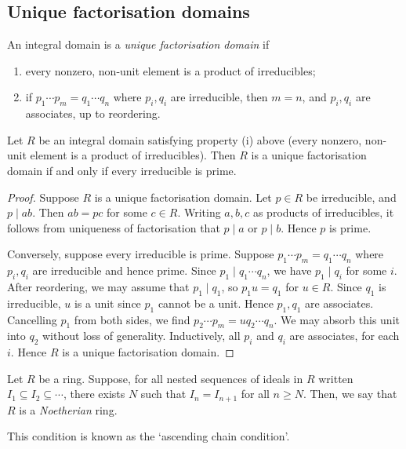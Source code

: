 \subsection{Unique factorisation domains}
\begin{definition}
	An integral domain is a \textit{unique factorisation domain} if
	\begin{enumerate}
		\item every nonzero, non-unit element is a product of irreducibles;
		\item if $p_1 \cdots p_m = q_1 \cdots q_n$ where $p_i, q_i$ are irreducible, then $m = n$, and $p_i, q_i$ are associates, up to reordering.
	\end{enumerate}
\end{definition}
\begin{proposition}
	Let $R$ be an integral domain satisfying property (i) above (every nonzero, non-unit element is a product of irreducibles).
	Then $R$ is a unique factorisation domain if and only if every irreducible is prime.
\end{proposition}
\begin{proof}
	Suppose $R$ is a unique factorisation domain.
	Let $p \in R$ be irreducible, and $p \mid ab$.
	Then $ab = pc$ for some $c \in R$.
	Writing $a, b, c$ as products of irreducibles, it follows from uniqueness of factorisation that $p \mid a$ or $p \mid b$.
	Hence $p$ is prime.

	Conversely, suppose every irreducible is prime.
	Suppose $p_1 \cdots p_m = q_1 \cdots q_n$ where $p_i, q_i$ are irreducible and hence prime.
	Since $p_1 \mid q_1 \cdots q_n$, we have $p_1 \mid q_i$ for some $i$.
	After reordering, we may assume that $p_1 \mid q_1$, so $p_1 u = q_1$ for $u \in R$.
	Since $q_1$ is irreducible, $u$ is a unit since $p_1$ cannot be a unit.
	Hence $p_1, q_1$ are associates.
	Cancelling $p_1$ from both sides, we find $p_2 \cdots p_m = u q_2 \cdots q_n$.
	We may absorb this unit into $q_2$ without loss of generality.
	Inductively, all $p_i$ and $q_i$ are associates, for each $i$.
	Hence $R$ is a unique factorisation domain.
\end{proof}
\begin{definition}
	Let $R$ be a ring.
	Suppose, for all nested sequences of ideals in $R$ written $I_1 \subseteq I_2 \subseteq \cdots$, there exists $N$ such that $I_n = I_{n+1}$ for all $n \geq N$.
	Then, we say that $R$ is a \textit{Noetherian} ring.
\end{definition}
This condition is known as the `ascending chain condition'.
